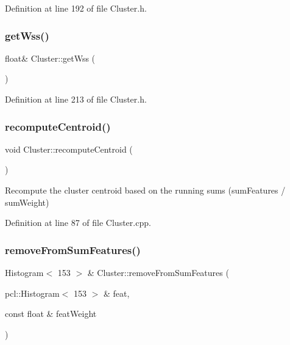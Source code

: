 Definition at line 192 of file Cluster.\+h.

\mbox{\label{class_cluster_ab8c35f60eff5f2f4c0508900650b058c}} 
\subsubsection{\texorpdfstring{get\+Wss()}{getWss()}}
{\footnotesize\ttfamily float\& Cluster\+::get\+Wss (\begin{DoxyParamCaption}{ }\end{DoxyParamCaption})\hspace{0.3cm}{\ttfamily [inline]}}



Definition at line 213 of file Cluster.\+h.

\mbox{\label{class_cluster_a3ed40ce6adf7cc47b9e5721baed4fb51}} 
\subsubsection{\texorpdfstring{recompute\+Centroid()}{recomputeCentroid()}}
{\footnotesize\ttfamily void Cluster\+::recompute\+Centroid (\begin{DoxyParamCaption}{ }\end{DoxyParamCaption})}

Recompute the cluster centroid based on the running sums (sum\+Features / sum\+Weight) 

Definition at line 87 of file Cluster.\+cpp.

\mbox{\label{class_cluster_a8cf196c9c3f77aeeafb7b793967e17ed}} 
\subsubsection{\texorpdfstring{remove\+From\+Sum\+Features()}{removeFromSumFeatures()}}
{\footnotesize\ttfamily Histogram$<$ 153 $>$ \& Cluster\+::remove\+From\+Sum\+Features (\begin{DoxyParamCaption}\item[{pcl\+::\+Histogram$<$ 153 $>$ \&}]{feat,  }\item[{const float \&}]{feat\+Weight }\end{DoxyParamCaption})}

